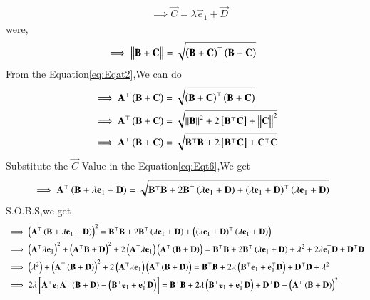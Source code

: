 \begin{enumerate}[label=\thesection.\arabic*,ref=\thesection.\theenumi]
\begin{align}
       &\implies \vec{C}=\lambda\vec{e}_1+\vec{D}\label{eq:EQT-C}
    \end{align}
    were,
    \begin{align}
       &\implies \left\Vert\mathbf{B}+\mathbf{C}\right\Vert= \sqrt{\left(\mathbf{B}+\mathbf{C}\right)^\top\left(\mathbf{B}+\mathbf{C}\right)}
    \end{align}
From the Equation\eqref{eq:Eqat2},We can do
\begin{align}
   &\implies \vec{A}^\top \brak{\vec{B}+\vec{C}}=\sqrt{\brak{\vec{B}+\vec{C}}^\top\brak{\vec{B}+\vec{C}}}\\
&\implies \vec{A}^\top \brak{\vec{B}+\vec{C}}=\sqrt{\norm{\vec{B}}^2+2\sbrak{\vec{B}^{\top}\vec{C}}+\norm{\vec{C}}^2}\\
&\implies \vec{A}^\top \brak{\vec{B}+\vec{C}}=\sqrt{{\vec{B}^{\top}\vec{B}}+2\sbrak{\vec{B}^{\top}\vec{C}}+{\vec{C}^\top\vec{C}}}\label{eq:Eqt6}
\end{align}
Substitute the $\vec{C}$ Value in the Equation\eqref{eq:Eqt6},We get
\begin{align}
&\implies\mathbf{A}^{\top}\left(\mathbf{B}+\lambda\mathbf{e}_1+\mathbf{D}\right)=\sqrt{\mathbf{B}^{\top}\mathbf{B}+2\mathbf{B}^{\top}\left(\lambda\mathbf{e}_1+\mathbf{D}\right)+\left(\lambda\mathbf{e}_1+\mathbf{D}\right)^{\top}\left(\lambda\mathbf{e}_1+\mathbf{D}\right)}
\end{align}
S.O.B.S,we get
\begin{align}
&\implies\brak{\vec{A}^{\top}\brak{\vec{B}+\lambda\vec{e}_1+\vec{D}}}^{2}=\vec{B}^{\top}\vec{B}+2\vec{B}^{\top}\brak{\lambda\vec{e}_1+\vec{D}}+\brak{\brak{\lambda\vec{e}_1+\vec{D}}^{\top}\brak{\lambda\vec{e}_1+\vec{D}}} \\
&\implies\brak{\vec{A}^{\top}\lambda\vec{e}_1}^{2}+\brak{\vec{A}^{\top}\vec{B}+\vec{D}}^{2}+2\brak{\vec{A}^{\top}\lambda\vec{e}_1}\brak{\vec{A}^{\top}\brak{\vec{B}+\vec{D}}}=\vec{B}^{\top}\vec{B}+2\vec{B}^{\top}\brak{\lambda\vec{e}_1+\vec{D}}+\lambda^{2}+2\lambda\vec{e}_1^{\top}\vec{D}+\vec{D}^{\top}\vec{D}\\
&\implies\brak{\lambda^{2}}+\brak{\vec{A}^{\top}\brak{\vec{B}+\vec{D}}}^{2}+2\brak{\vec{A}^{\top}\lambda\vec{e}_1}\brak{\vec{A}^{\top}\brak{\vec{B}+\vec{D}}}=\vec{B}^{\top}\vec{B}+2\lambda\brak{\vec{B}^{\top}\vec{e}_1+\vec{e}_1^{\top}\vec{D}}+\vec{D}^{\top}\vec{D}+\lambda^{2}\\
&\implies2\lambda\sbrak{\vec{A}^\top\vec{e}_1\vec{A}^\top\brak{\vec{B}+\vec{D}}-\brak{\vec{B}^{\top}\vec{e}_1+\vec{e}_1^{\top}\vec{D}}}=\vec{B}^{\top}\vec{B}+2\lambda\brak{\vec{B}^{\top}\vec{e}_1+\vec{e}_1^{\top}\vec{D}}+\vec{D}^{\top}\vec{D}-\brak{\vec{A}^{\top}\brak{\vec{B}+\vec{D}}}^{2}\\

\end{align}
\end{enumerate}

